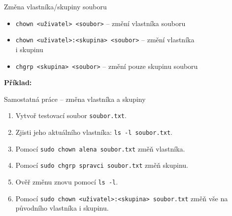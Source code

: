 \documentclass{beamer}
\begin{document}
\begin{frame}[fragile]{Změna vlastníka/skupiny souboru}
	\begin{itemize}
		\item \texttt{chown <uživatel> <soubor>} – změní vlastníka souboru
		\item \texttt{chown <uživatel>:<skupina> <soubor>} – změní vlastníka \\i skupinu
		\item \texttt{chgrp <skupina> <soubor>} – změní pouze skupinu souboru
	\end{itemize}
	
		\vspace{1.5em}
	\textbf{Příklad:}
\end{frame}

\begin{frame}{Samostatná práce – změna vlastníka a skupiny}
	\small
	\begin{enumerate}
		\item Vytvoř testovací soubor \texttt{soubor.txt}.
		\item Zjisti jeho aktuálního vlastníka: \texttt{ls -l soubor.txt}.
		\item Pomocí \texttt{sudo chown alena soubor.txt} změň vlastníka.
		\item Pomocí \texttt{sudo chgrp spravci soubor.txt} změň skupinu.
		\item Ověř změnu znovu pomocí \texttt{ls -l}.
		\item Pomocí \texttt{sudo chown <uživatel>:<skupina> soubor.txt} změň vše na původního vlastníka i skupinu.
	\end{enumerate}
\end{frame}
\end{document}
